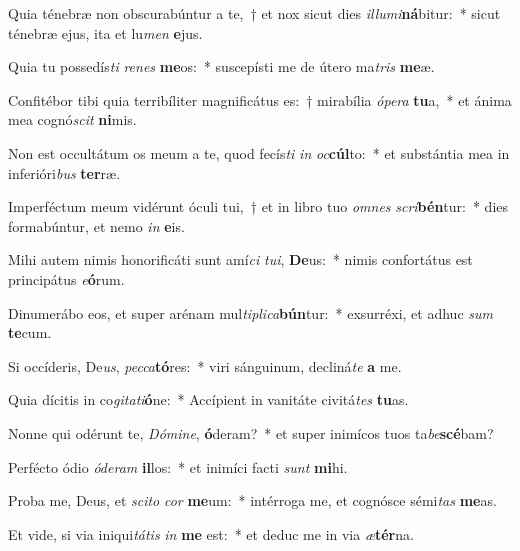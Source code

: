 \item Quia ténebræ non obscurabúntur a te,~† et nox sicut dies \textit{il}\textit{lu}\textit{mi}\textbf{ná}bitur:~* sicut ténebræ ejus, ita et lu\textit{men} \textbf{e}jus.
\item Quia tu possedís\textit{ti} \textit{re}\textit{nes} \textbf{me}os:~* suscepísti me de útero ma\textit{tris} \textbf{me}æ.
\item Confitébor tibi quia terribíliter magnificátus es:~† mirabília \textit{ó}\textit{pe}\textit{ra} \textbf{tu}a,~* et ánima mea cognó\textit{scit} \textbf{ni}mis.
\item Non est occultátum os meum a te, quod fecís\textit{ti} \textit{in} \textit{oc}\textbf{cúl}to:~* et substántia mea in inferióri\textit{bus} \textbf{ter}ræ.
\item Imperféctum meum vidérunt óculi tui,~† et in libro tuo \textit{om}\textit{nes} \textit{scri}\textbf{bén}tur:~* dies formabúntur, et nemo \textit{in} \textbf{e}is.
\item Mihi autem nimis honorificáti sunt amí\textit{ci} \textit{tu}\textit{i}, \textbf{De}us:~* nimis confortátus est principátus \textit{e}\textbf{ó}rum.
\item Dinumerábo eos, et super arénam mul\textit{ti}\textit{pli}\textit{ca}\textbf{bún}tur:~* exsurréxi, et adhuc \textit{sum} \textbf{te}cum.
\item Si occíderis, De\textit{us}, \textit{pec}\textit{ca}\textbf{tó}res:~* viri sánguinum, decliná\textit{te} \textbf{a} me.
\item Quia dícitis in co\textit{gi}\textit{ta}\textit{ti}\textbf{ó}ne:~* Accípient in vanitáte civitá\textit{tes} \textbf{tu}as.
\item Nonne qui odérunt te, \textit{Dó}\textit{mi}\textit{ne}, \textbf{ó}deram?~* et super inimícos tuos ta\textit{be}\textbf{scé}bam?
\item Perfécto ódio \textit{ó}\textit{de}\textit{ram} \textbf{il}los:~* et inimíci facti \textit{sunt} \textbf{mi}hi.
\item Proba me, Deus, et \textit{sci}\textit{to} \textit{cor} \textbf{me}um:~* intérroga me, et cognósce sémi\textit{tas} \textbf{me}as.
\item Et vide, si via iniqui\textit{tá}\textit{tis} \textit{in} \textbf{me} est:~* et deduc me in via \textit{æ}\textbf{tér}na.
